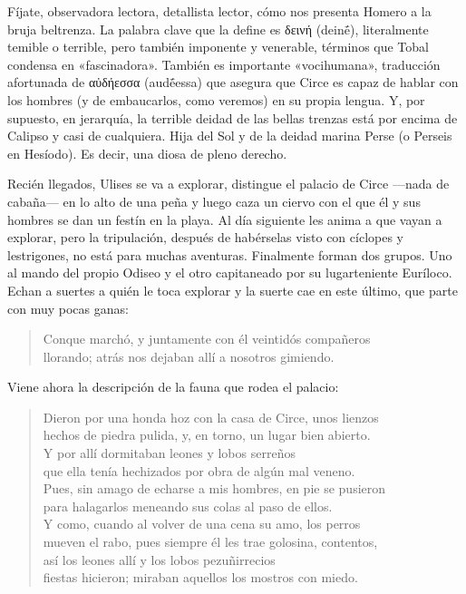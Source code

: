 \documentclass[11pt,a4paper]{article}
\newcommand{\gr}[1]{\foreignlanguage{greek}{#1}}
\begin{document}
Fíjate, observadora lectora, detallista lector, cómo nos presenta Homero a la bruja beltrenza. La palabra clave que la define es \gr{δεινή} (deinḗ), literalmente temible o terrible, pero también imponente y venerable, términos que Tobal condensa en «fascinadora». También es importante «vocihumana», traducción afortunada de \gr{αὐδήεσσα} (audḗessa) que asegura que Circe es capaz de hablar con los hombres (y de embaucarlos, como veremos) en su propia lengua. Y, por supuesto, en jerarquía, la terrible deidad de las bellas trenzas está por encima de Calipso y casi de cualquiera. Hija del Sol y de la deidad marina Perse (o Perseis en Hesíodo). Es decir, una diosa de pleno derecho.

Recién llegados, Ulises se va a explorar, distingue el palacio de Circe ---nada de cabaña--- en lo alto de una peña y luego caza un ciervo con el que él y sus hombres se dan un festín en la playa. Al día siguiente les anima a que vayan a explorar, pero la tripulación, después de habérselas visto con cíclopes y lestrigones, no está para muchas aventuras. Finalmente forman dos grupos. Uno al mando del propio Odiseo y el otro capitaneado por su lugarteniente Euríloco. Echan a suertes a quién le toca explorar y la suerte cae en este último, que parte con muy pocas ganas:

\begin{verse}
Conque marchó, y juntamente con él veintidós compañeros\\
llorando; atrás nos dejaban allí a nosotros gimiendo.
\end{verse}

Viene ahora la descripción de la fauna que rodea el palacio:

\begin{verse}
Dieron por una honda hoz con la casa de Circe, unos lienzos\\
hechos de piedra pulida, y, en torno, un lugar bien abierto.\\
Y por allí dormitaban leones y lobos serreños\\
que ella tenía hechizados por obra de algún mal veneno.\\
Pues, sin amago de echarse a mis hombres, en pie se pusieron\\
para halagarlos meneando sus colas al paso de ellos.\\
Y como, cuando al volver de una cena su amo, los perros\\
mueven el rabo, pues siempre él les trae golosina, contentos,\\
así los leones allí y los lobos pezuñirrecios\\
fiestas hicieron; miraban aquellos los mostros con miedo.
\end{verse}
\end{document}
